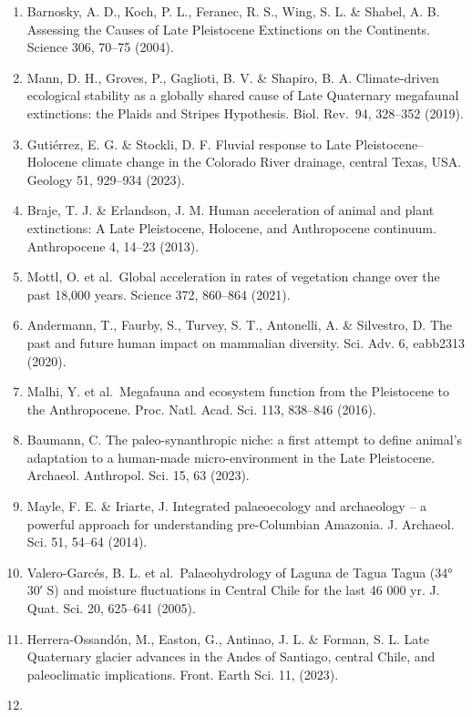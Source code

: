 \documentclass[
]{article}
\providecommand{\tightlist}{%
  \setlength{\itemsep}{0pt}\setlength{\parskip}{0pt}}
\begin{document}
\begin{enumerate}
\def\labelenumi{\arabic{enumi}.}
\tightlist
\item
  Barnosky, A. D., Koch, P. L., Feranec, R. S., Wing, S. L. \& Shabel,
  A. B. Assessing the Causes of Late Pleistocene Extinctions on the
  Continents. Science 306, 70--75 (2004).
\item
  Mann, D. H., Groves, P., Gaglioti, B. V. \& Shapiro, B. A.
  Climate-driven ecological stability as a globally shared cause of Late
  Quaternary megafaunal extinctions: the Plaids and Stripes Hypothesis.
  Biol. Rev.~94, 328--352 (2019).
\item
  Gutiérrez, E. G. \& Stockli, D. F. Fluvial response to Late
  Pleistocene--Holocene climate change in the Colorado River drainage,
  central Texas, USA. Geology 51, 929--934 (2023).
\item
  Braje, T. J. \& Erlandson, J. M. Human acceleration of animal and
  plant extinctions: A Late Pleistocene, Holocene, and Anthropocene
  continuum. Anthropocene 4, 14--23 (2013).
\item
  Mottl, O. et al.~Global acceleration in rates of vegetation change
  over the past 18,000 years. Science 372, 860--864 (2021).
\item
  Andermann, T., Faurby, S., Turvey, S. T., Antonelli, A. \& Silvestro,
  D. The past and future human impact on mammalian diversity. Sci. Adv.
  6, eabb2313 (2020).
\item
  Malhi, Y. et al.~Megafauna and ecosystem function from the Pleistocene
  to the Anthropocene. Proc. Natl. Acad. Sci. 113, 838--846 (2016).
\item
  Baumann, C. The paleo-synanthropic niche: a first attempt to define
  animal's adaptation to a human-made micro-environment in the Late
  Pleistocene. Archaeol. Anthropol. Sci. 15, 63 (2023).
\item
  Mayle, F. E. \& Iriarte, J. Integrated palaeoecology and archaeology
  -- a powerful approach for understanding pre-Columbian Amazonia. J.
  Archaeol. Sci. 51, 54--64 (2014).
\item
  Valero-Garcés, B. L. et al.~Palaeohydrology of Laguna de Tagua Tagua
  (34° 30′ S) and moisture fluctuations in Central Chile for the last 46
  000 yr. J. Quat. Sci. 20, 625--641 (2005).
\item
  Herrera-Ossandón, M., Easton, G., Antinao, J. L. \& Forman, S. L. Late
  Quaternary glacier advances in the Andes of Santiago, central Chile,
  and paleoclimatic implications. Front. Earth Sci. 11, (2023).
\item

\end{enumerate}
\end{document}
